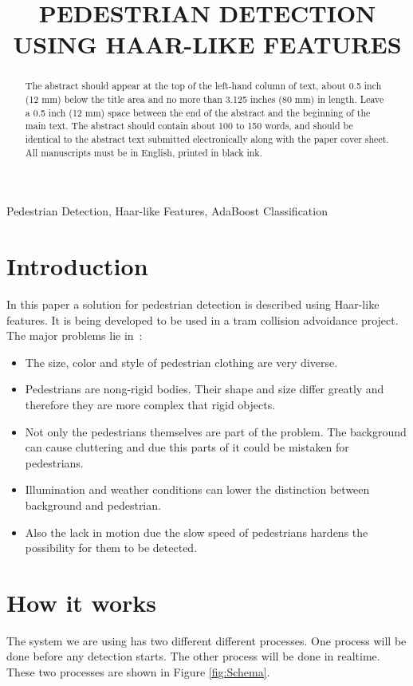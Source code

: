 \documentclass{article}
\title{PEDESTRIAN DETECTION USING HAAR-LIKE FEATURES}
\begin{document}
%
\maketitle
%
\begin{abstract}
The abstract should appear at the top of the left-hand column of text, about
0.5 inch (12 mm) below the title area and no more than 3.125 inches (80 mm) in
length.  Leave a 0.5 inch (12 mm) space between the end of the abstract and the
beginning of the main text.  The abstract should contain about 100 to 150
words, and should be identical to the abstract text submitted electronically
along with the paper cover sheet.  All manuscripts must be in English, printed
in black ink.
\end{abstract}
%
\begin{keywords}
Pedestrian Detection, Haar-like Features, AdaBoost Classification
\end{keywords}
%
\section{Introduction}
\label{sec:intro}
In this paper a solution for pedestrian detection is described using Haar-like features. It is being developed to be used in a tram collision advoidance project. 
\\
The major problems lie in~\cite{monteiro2006vision}:
\begin{itemize}
\item The size, color and style of pedestrian clothing are very diverse.
\item Pedestrians are nong-rigid bodies. Their shape and size differ greatly and therefore they are more complex that rigid objects.
\item Not only the pedestrians themselves are part of the problem. The background can cause cluttering and due this parts of it could be mistaken for pedestrians.
\item Illumination and weather conditions can lower the distinction between background and pedestrian.
\item Also the lack in motion due the slow speed of pedestrians hardens the possibility for them to be detected.
\end{itemize}
\section{How it works}
\label{sec:format}

The system we are using has two different different processes. One process will be done before any detection starts. The other process will be done in realtime. These two processes are shown in Figure \ref{fig:Schema}.
\end{document}
